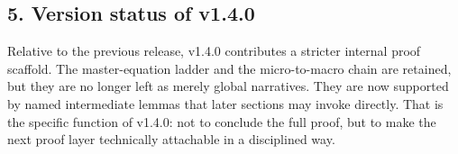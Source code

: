\subsection*{5. Version status of v1.4.0}
Relative to the previous release, v1.4.0 contributes a stricter internal
proof scaffold. The master-equation ladder and the micro-to-macro chain are
retained, but they are no longer left as merely global narratives. They are now
supported by named intermediate lemmas that later sections may invoke directly.
That is the specific function of v1.4.0: not to conclude the full proof,
but to make the next proof layer technically attachable in a disciplined way.


